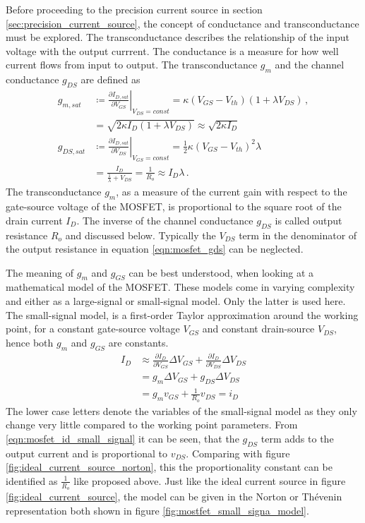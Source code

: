 Before proceeding to the precision current source in section \ref{sec:precision_current_source}, the concept of conductance and transconductance must be explored. The transconductance describes the relationship of the input voltage with the output currrent. The conductance is a measure for how well current flows from input to output. The transconductance $g_m$ and the channel conductance $g_{DS}$ are defined as
\begin{align}
    g_{m, sat} &\coloneqq \left. \frac{\partial I_{D,sat}}{\partial V_{GS}} \right|_{V_{DS} = const} = \kappa \left(V_{GS} - V_{th} \right) (1 + \lambda V_{DS}) \, , \label{eqn:mosfet_gm}\\
    &= \sqrt{2 \kappa I_D \left(1+ \lambda V_{DS}\right)} \approx \sqrt{2 \kappa I_D} \label{eqn:mosfet_gm_approximation} \\
    g_{DS, sat} &\coloneqq \left. \frac{\partial I_{D,sat}}{\partial V_{DS}} \right|_{V_{GS} = const} = \frac{1}{2} \kappa \left(V_{GS} - V_{th} \right)^2 \lambda\\
    &= \frac{I_D}{\frac{1}{\lambda} + V_{DS}} = \frac{1}{R_o} \approx I_D \lambda \label{eqn:mosfet_gds}\,.
\end{align}
The transconductance $g_m$, as a measure of the current gain with respect to the gate-source voltage of the MOSFET, is proportional to the square root of the drain current $I_D$. The inverse of the channel conductance $g_{DS}$ is called output resistance $R_o$ and discussed below. Typically the $V_{DS}$ term in the denominator of the output resistance in equation \ref{eqn:mosfet_gds} can be neglected.

The meaning of $g_{m}$ and $g_{GS}$ can be best understood, when looking at a mathematical model of the MOSFET. These models come in varying complexity and either as a large-signal or small-signal model. Only the latter is used here. The small-signal model, is a first-order Taylor approximation around the working point, for a constant gate-source voltage $V_{GS}$ and constant drain-source $V_{DS}$, hence both $g_{m}$ and $g_{GS}$ are constants.
\begin{align}
    I_D &\approx \frac{\partial I_D}{\partial V_{GS}} \Delta V_{GS} + \frac{\partial I_D}{\partial V_{DS}} \Delta V_{DS}\\
    &= g_{m} \Delta V_{GS} + g_{DS} \Delta V_{DS}\\
    &= g_{m} v_{GS} + \frac{1}{R_o} v_{DS} = i_D \label{eqn:mosfet_id_small_signal}
\end{align}
The lower case letters denote the variables of the small-signal model as they only change very little compared to the working point parameters.
From \ref{eqn:mosfet_id_small_signal} it can be seen, that the $g_{DS}$ term adds to the output current and is proportional to $v_{DS}$. Comparing with figure \ref{fig:ideal_current_source_norton}, this the proportionality constant can be identified as $\frac{1}{R_o}$ like proposed above. Just like the ideal current source in figure \ref{fig:ideal_current_source}, the model can be given in the Norton or Thévenin representation both shown in figure \ref{fig:mostfet_small_signa_model}.

